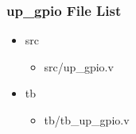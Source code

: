 \subsubsection{up\_gpio File List}
\begin{itemize}
\item src
	\begin{itemize}
	\item src/up\_gpio.v
	\end{itemize}
\item tb
	\begin{itemize}
	\item tb/tb\_up\_gpio.v
	\end{itemize}
\end{itemize}
